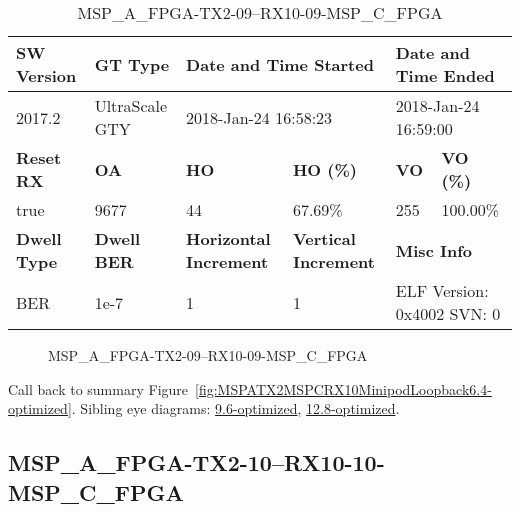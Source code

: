 \begin{table}[h]
\centering
\caption{MSP\_A\_FPGA-TX2-09--RX10-09-MSP\_C\_FPGA}
\label{tab:MSPAFPGATX209RX1009MSPCFPGA6.4-optimized}
\begin{tabular}{@{}|l|l|l|l|l|l|@{}}
\toprule
\textbf{SW Version}                & \textbf{GT Type}   & \multicolumn{2}{l|}{\textbf{Date and Time Started}}            & \multicolumn{2}{l|}{\textbf{Date and Time Ended}}        \\ \midrule
2017.2                       & UltraScale GTY          & \multicolumn{2}{l|}{2018-Jan-24 16:58:23}                   & \multicolumn{2}{l|}{2018-Jan-24 16:59:00}               \\ \midrule
\textbf{Reset RX}                  & \textbf{OA} & \textbf{HO}   & \textbf{HO (\%)} & \textbf{VO} & \textbf{VO (\%)} \\ \midrule
true & 9677        & 44          & 67.69\%        & 255        & 100.00\%       \\ \midrule
\textbf{Dwell Type}                & \textbf{Dwell BER} & \textbf{Horizontal Increment} & \textbf{Vertical Increment}    & \multicolumn{2}{l|}{\textbf{Misc Info}}                  \\ \midrule
BER                            & 1e-7        & 1        & 1           & \multicolumn{2}{l|}{ELF Version: 0x4002 SVN: 0}                         \\ \bottomrule
\end{tabular}
\end{table}

\begin{figure}[h]
\caption{MSP\_A\_FPGA-TX2-09--RX10-09-MSP\_C\_FPGA} \label{fig:MSPAFPGATX209RX1009MSPCFPGA6.4-optimized}
\end{figure}

Call back to summary Figure~\ref{fig:MSPATX2MSPCRX10MinipodLoopback6.4-optimized}.
Sibling eye diagrams: \hyperref[sec:MSPAFPGATX209RX1009MSPCFPGA9.6-optimized]{9.6-optimized}, \hyperref[sec:MSPAFPGATX209RX1009MSPCFPGA12.8-optimized]{12.8-optimized}.

\clearpage
\newpage


\subsection{MSP\_A\_FPGA-TX2-10--RX10-10-MSP\_C\_FPGA}\label{sec:MSPAFPGATX210RX1010MSPCFPGA6.4-optimized}

